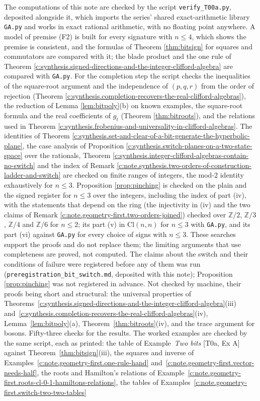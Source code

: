 \documentclass[11pt]{article}
\theoremstyle{definition}
\theoremstyle{plain}
\providecommand{\Cl}{}\renewcommand{\Cl}{\mathrm{Cl}}
\providecommand{\Z}{}\renewcommand{\Z}{\mathbb{Z}}
\begin{document}
\label{c:note.geometry-first.setting-machine-verification}
The computations of this note are checked by the script \texttt{verify\_T00a.py}, deposited alongside it, which imports the series' shared exact-arithmetic library \texttt{GA.py} and works in exact rational arithmetic, with no floating point anywhere. A model of premise (F2) is built for every signature with $n \leq 4$, which shows the premise is consistent, and the formulas of Theorem \ref{thm:bitsign} for squares and commutators are compared with it; the blade product and the one rule of Theorem \ref{c:synthesis.signed-directions-and-the-integer-clifford-algebra} are compared with \texttt{GA.py}. For the completion step the script checks the inequalities of the square-root argument and the independence of $(p,q,r)$ from the order of rejection (Theorem \ref{c:synthesis.completion-recovers-the-real-clifford-algebras}), the reduction of Lemma \ref{lem:bitpoly}(b) on known examples, the square-root formula and the real coefficients of $g_{t}$ (Theorem \ref{thm:bitroots}), and the relations used in Theorem \ref{c:synthesis.frobenius-and-universality-in-clifford-algebras}. The identities of Theorem \ref{c:synthesis.set-and-clear-of-a-bit-generate-the-hyperbolic-plane}, the case analysis of Proposition \ref{c:synthesis.switch-planes-on-a-two-state-space} over the rationals, Theorem \ref{c:synthesis.integer-clifford-algebras-contain-no-switch} and the index of Remark \ref{c:note.synthesis.two-orders-of-construction-ladder-and-switch} are checked on finite ranges of integers, the mod-$2$ identity exhaustively for $n \leq 3$. Proposition \ref{prop:pinching} is checked on the plain and the signed register for $n \leq 3$ over the integers, including the index of part (iv), with the statements that depend on the ring (the injectivity in (iv) and the two claims of Remark \ref{c:note.geometry-first.two-orders-joined}) checked over $\Z/2$, $\Z/3$, $\Z/4$ and $\Z/6$ for $n \leq 2$; its part (v) in $\Cl(n,n)$ for $n \leq 3$ with \texttt{GA.py}, and its part (vi) against \texttt{GA.py} for every choice of signs with $n \leq 3$. These searches support the proofs and do not replace them; the limiting arguments that use completeness are proved, not computed. The claims about the switch and their conditions of failure were registered before any of them was run (\texttt{preregistration\_bit\_switch.md}, deposited with this note); Proposition \ref{prop:pinching} was not registered in advance. Not checked by machine, their proofs being short and structural: the universal properties of Theorems~\ref{c:synthesis.signed-directions-and-the-integer-clifford-algebra}(iii) and~\ref{c:synthesis.completion-recovers-the-real-clifford-algebras}(iv), Lemma~\ref{lem:bitpoly}(a), Theorem~\ref{thm:bitroots}(iv), and the trace argument for bosons. Fifty-three checks for the results. The worked examples are checked by the same script, each as printed: the table of Example~\emph{Two bits} [T0a, Ex A] against Theorem~\ref{thm:bitsign}(iii), the squares and inverse of Examples~\ref{c:note.geometry-first.one-rule-hand} and~\ref{c:note.geometry-first.vector-needs-half}, the roots and Hamilton's relations of Example~\ref{c:note.geometry-first.roots-cl-0-1-hamiltons-relations}, the tables of Examples~\ref{c:note.geometry-first.switch-two-two-tables} 
\end{document}
